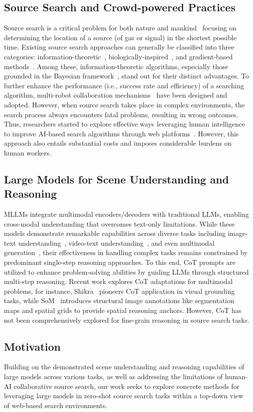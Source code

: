 \subsection{Source Search and Crowd-powered Practices}
Source search is a critical problem for both nature and mankind~\cite{jing2021recent} focusing on determining the location of a source (of gas or signal) in the shortest possible time. Existing source search approaches can generally be classified into three categories: information-theoretic~\cite{jang2023improved}, biologically-inspired~\cite{al2021distributed}, and gradient-based methods~\cite{jiang2019source}. Among these, information-theoretic algorithms, especially those grounded in the Bayesian framework~\cite{ojeda2024robotic}, stand out for their distinct advantages. To further enhance the performance (i.e., success rate and efficiency) of a searching algorithm, multi-robot collaboration mechanisms~\cite{tang2020multirobot} have been designed and adopted. However, when source search takes place in complex environments, the search process always encounters fatal problems, resulting in wrong outcomes. Thus, researchers started to explore effective ways leveraging human intelligence to improve AI-based search algorithms through web platforms~\cite{zhao2024user}. However, this approach also entails substantial costs and imposes considerable burdens on human workers.

\subsection{Large Models for Scene Understanding and Reasoning}
MLLMs integrate multimodal encoders/decoders with traditional LLMs, enabling cross-modal understanding that overcomes text-only limitations. While these models demonstrate remarkable capabilities across diverse tasks including image-text understanding~\cite{liu2024visual}, video-text understanding~\cite{li2023videochat}, and even multimodal generation~\cite{peng2023kosmos}, their effectiveness in handling complex tasks remains constrained by predominant single-step reasoning approaches. To this end, CoT prompts are utilized to enhance problem-solving abilities by guiding LLMs through structured multi-step reasoning. Recent work explores CoT adaptations for multimodal problems, for instance, Shikra~\cite{chen2023shikra} pioneers CoT application in visual grounding tasks, while SoM~\cite{yang2023set} introduces structural image annotations like segmentation maps and spatial grids to provide spatial reasoning anchors. However, CoT has not been comprehensively explored for fine-grain reasoning in source search tasks.

\subsection{Motivation}
Building on the demonstrated scene understanding and reasoning capabilities of large models across various tasks, as well as addressing the limitations of human-AI collaborative source search, our work seeks to explore concrete methods for leveraging large models in zero-shot source search tasks within a top-down view of web-based search environments.


